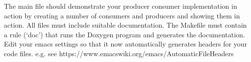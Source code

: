 \documentclass[10pt,a4paper]{article}
\begin{document}
The main file should demonstrate your producer consumer implementation in action by creating a  number of consumers and producers and showing them in action.
All files must include suitable documentation. The Makefile must contain a rule (‘doc’) that runs the Doxygen program and generates the documentation.
Edit your emacs settings so that it now automatically generates headers for your code files.  e.g. see https://www.emacswiki.org/emacs/AutomaticFileHeaders
\end{document}
